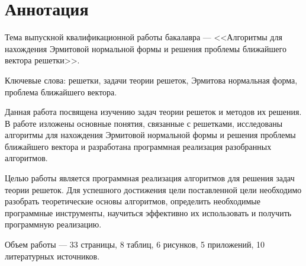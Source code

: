 \newpage
\setcounter{page}{2}

\section*{Аннотация}

Тема выпускной квалификационной работы бакалавра --- <<Алгоритмы для нахождения Эрмитовой нормальной формы и решения проблемы ближайшего вектора решетки>>.

Ключевые слова: решетки, задачи теории решеток, Эрмитова нормальная форма, проблема ближайшего вектора.

Данная работа посвящена изучению задач теории решеток и методов их решения. В работе изложены основные понятия, связанные с решетками, исследованы алгоритмы для нахождения Эрмитовой нормальной формы и решения проблемы ближайшего вектора и разработана программная реализация разобранных алгоритмов.

Целью работы является программная реализация алгоритмов для решения задач теории решеток. Для успешного достижения цели поставленной цели необходимо разобрать теоретические основы алгоритмов, определить необходимые программные инструменты,  научиться эффективно их использовать и получить программную реализацию.

Объем работы --- 33 страницы, 8 таблиц, 6 рисунков, 5 приложений, 10 литературных источников.

\clearpage